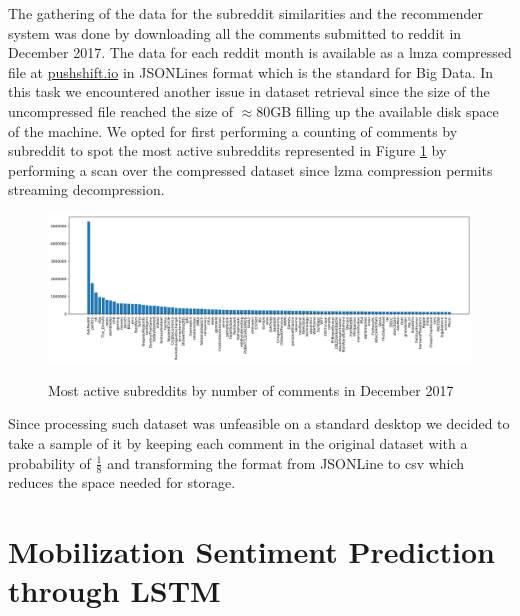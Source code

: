 \documentclass{article}
\begin{document}
The gathering of the data for the subreddit similarities and the recommender
system was done by downloading all the comments submitted to reddit in December
2017. The data for each reddit month is available as a lmza compressed file at
\href{files.pushshift.io}{pushshift.io} in JSONLines format which is the
standard for Big Data. In this task we encountered another issue in dataset
retrieval since the size of the uncompressed file reached the size of $\approx
80$GB filling up the available disk space of the machine. We opted for first
performing a counting of comments by subreddit to spot the most active
subreddits represented in Figure \ref{fig:hist} by performing a scan over the
compressed dataset since lzma compression permits streaming decompression.

\begin{figure}[h]
\centering
\includegraphics[width=\linewidth]{subreddit_activity.png} \\
\caption{Most active subreddits by number of comments in December 2017}
\label{fig:hist}
\end{figure}

Since processing such dataset was unfeasible on a standard desktop we decided to
take a sample of it by keeping each comment in the original dataset with a
probability of $\frac{1}{8}$ and transforming the format from JSONLine to csv
which reduces the space needed for storage.


\section{Mobilization Sentiment Prediction through LSTM}
\label{sec:davide}
\end{document}
